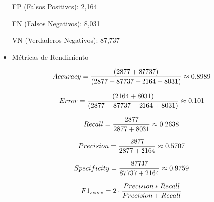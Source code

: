 \begin{itemize}
            FP (Falsos Positivos): 2,164

            FN (Falsos Negativos): 8,031

            VN (Verdaderos Negativos): 87,737


      \item Métricas de Rendimiento

            \begin{align}
                  Accuracy = \frac{(2877+87737)}{(2877+87737+2164+8031)}\approx 0.8989 \notag \\
                  \label{eq:accuracy_if}
            \end{align}


            \begin{align}
                  Error = \frac{(2164+8031)}{(2877+87737+2164+8031)}\approx 0.101 \notag \\
                  \label{eq:error_if}
            \end{align}

            \begin{align}
                  Recall = \frac{2877}{2877+8031}\approx 0.2638 \notag \\
                  \label{eq:recall_if}
            \end{align}

            \begin{align}
                  Precision = \frac{2877}{2877+2164}\approx 0.5707 \notag \\
                  \label{eq:precision_if}
            \end{align}

            \begin{align}
                  Specificity = \frac{87737}{87737+2164}\approx 0.9759 \notag \\
                  \label{eq:specificity_if}
            \end{align}

            \begin{align}
                  F1_{score} = 2 \cdot \frac{Precision * Recall}{Precision+Recall} \notag \\
                  \label{eq:f1_if}
            \end{align}

\end{itemize}


